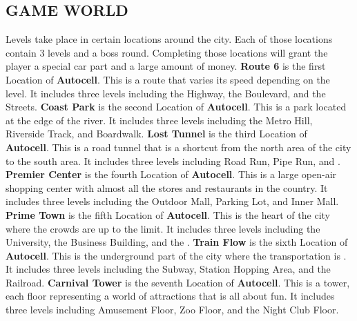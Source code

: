 \documentclass[12pt]{article}
\begin{document}
\begin{CJK}{UTF8}{min}
	\subsection*{GAME WORLD}
	Levels take place in certain locations around the city. Each of those locations contain 3 levels and a boss round. Completing those locations will grant the player a special car part and a large amount of money. \newline \newline
	\textbf{Route 6} is the first Location of \textbf{Autocell}. This is a route that varies its speed depending on the level. It includes three levels including the Highway, the Boulevard, and the Streets. \newline \newline
	\textbf{Coast Park} is the second Location of \textbf{Autocell}. This is a park located at the edge of the river. It includes three levels including the Metro Hill, Riverside Track, and Boardwalk. \newline \newline
	\textbf{Lost Tunnel} is the third Location of \textbf{Autocell}. This is a road tunnel that is a shortcut from the north area of the city to the south area. It includes three levels including Road Run, Pipe Run, and \hrulefill. \newline \newline
	\textbf{Premier Center} is the fourth Location of \textbf{Autocell}. This is a large open-air shopping center with almost all the stores and restaurants in the country. It includes three levels including the Outdoor Mall, Parking Lot, and Inner Mall. \newline \newline
	\textbf{Prime Town} is the fifth Location of \textbf{Autocell}. This is the heart of the city where the crowds are up to the limit. It includes three levels including the University, the Business Building, and the \hrulefill. \newline \newline
	\textbf{Train Flow} is the sixth Location of \textbf{Autocell}. This is the underground part of the city where the transportation is . It includes three levels including the Subway, Station Hopping Area, and the Railroad. \newline \newline
	\textbf{Carnival Tower} is the seventh Location of \textbf{Autocell}. This is a tower, each floor representing a world of attractions that is all about fun. It includes three levels including Amusement Floor, Zoo Floor, and the Night Club Floor. \newline \newline

\end{CJK}
\end{document}
